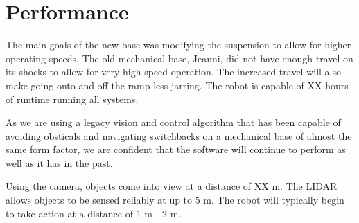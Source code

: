 \section{Performance}

The main goals of the new base was modifying the suspension to allow for higher operating speeds. The old mechanical base, Jeanni, did not have enough travel on its shocks to allow for very high speed operation. The increased travel will also make going onto and off the ramp less jarring. The robot is capable of XX hours of runtime running all systems.

As we are using a legacy vision and control algorithm that has been capable of avoiding obsticals and navigating switchbacks on a mechanical base of almost the same form factor, we are confident that the software will continue to perform as well as it has in the past.

Using the camera, objects come into view at a distance of XX m. The LIDAR allows objects to be sensed reliably at up to 5 m. The robot will typically begin to take action at a distance of 1 m - 2 m.